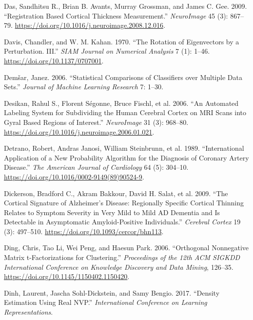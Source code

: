 \documentclass[
  10pt,
  letterpaper,
]{report}
\newlength{\cslhangindent}
\newenvironment{CSLReferences}[2] %
 {\begin{list}{}{%
  \setlength{\itemindent}{0pt}
  \setlength{\leftmargin}{0pt}
  \setlength{\parsep}{0pt}
  \ifodd #1
   \setlength{\leftmargin}{\cslhangindent}
   \setlength{\itemindent}{-1\cslhangindent}
  \fi
  \setlength{\itemsep}{#2\baselineskip}}}
 {\end{list}}
\begin{document}
\begin{CSLReferences}{1}{1}
Das, Sandhitsu R., Brian B. Avants, Murray Grossman, and James C. Gee.
2009. {``Registration Based Cortical Thickness Measurement.''}
\emph{NeuroImage} 45 (3): 867--79.
\url{https://doi.org/10.1016/j.neuroimage.2008.12.016}.

Davis, Chandler, and W. M. Kahan. 1970. {``The Rotation of Eigenvectors
by a Perturbation. {III}.''} \emph{SIAM Journal on Numerical Analysis} 7
(1): 1--46. \url{https://doi.org/10.1137/0707001}.

Demšar, Janez. 2006. {``Statistical Comparisons of Classifiers over
Multiple Data Sets.''} \emph{Journal of Machine Learning Research} 7:
1--30.

Desikan, Rahul S., Florent Ségonne, Bruce Fischl, et al. 2006. {``An
Automated Labeling System for Subdividing the Human Cerebral Cortex on
{MRI} Scans into Gyral Based Regions of Interest.''} \emph{NeuroImage}
31 (3): 968--80. \url{https://doi.org/10.1016/j.neuroimage.2006.01.021}.

Detrano, Robert, Andras Janosi, William Steinbrunn, et al. 1989.
{``International Application of a New Probability Algorithm for the
Diagnosis of Coronary Artery Disease.''} \emph{The American Journal of
Cardiology} 64 (5): 304--10.
\url{https://doi.org/10.1016/0002-9149(89)90524-9}.

{Dickerson, Bradford C., Akram Bakkour, David H. Salat, et al.} 2009.
{``The Cortical Signature of {Alzheimer's} Disease: Regionally Specific
Cortical Thinning Relates to Symptom Severity in Very Mild to Mild {AD}
Dementia and Is Detectable in Asymptomatic Amyloid-Positive
Individuals.''} \emph{Cerebral Cortex} 19 (3): 497--510.
\url{https://doi.org/10.1093/cercor/bhn113}.

Ding, Chris, Tao Li, Wei Peng, and Haesun Park. 2006. {``Orthogonal
Nonnegative Matrix t-Factorizations for Clustering.''} \emph{Proceedings
of the 12th ACM SIGKDD International Conference on Knowledge Discovery
and Data Mining}, 126--35.
\url{https://doi.org/10.1145/1150402.1150420}.

Dinh, Laurent, Jascha Sohl-Dickstein, and Samy Bengio. 2017. {``Density
Estimation Using {Real NVP}.''} \emph{International Conference on
Learning Representations}.


\end{CSLReferences}
\end{document}
